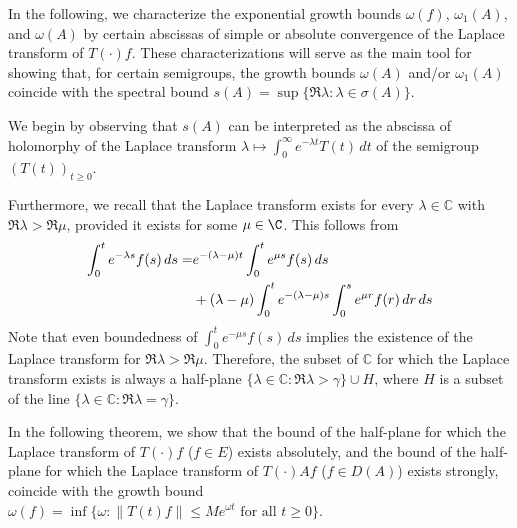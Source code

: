 \noindent
In the following, we characterize the exponential growth bounds $\omega(f)$, $\omega_{1}(A)$, and $\omega(A)$ by certain abscissas of simple or absolute convergence of the Laplace transform of $T(\cdot)f$. 
These characterizations will serve as the main tool for showing that, for certain semigroups, the growth bounds $\omega(A)$ and/or $\omega_{1}(A)$ coincide with the spectral bound $s(A) = \sup\{\Re \lambda : \lambda \in \sigma(A)\}$.

\bigskip
\noindent
We begin by observing that $s(A)$ can be interpreted as the abscissa of holomorphy of the Laplace transform $\lambda \mapsto \int_{0}^{\infty} e^{-\lambda t} T(t) \, dt$ of the semigroup $(T(t))_{t \geq 0}$.

\noindent
Furthermore, we recall that the Laplace transform exists for every $\lambda \in \mathbb{C}$ with $\Re \lambda > \Re \mu$, provided it exists for some $\mu\in\C$.
This follows from 
\begin{align}\label{eq:a4-1.1}
\int_0^t e^{-\lambda s} f(s)\, ds = &e^{-(\lambda-\mu)t} \int_{0}^{t} e^{\mu s} f(s) \, ds \\ &+ (\lambda - \mu) \int_{0}^{t} e^{-(\lambda-\mu)s} \int_{0}^{s} e^{\mu r} f(r) \, dr \, ds \notag
\end{align}
Note that even boundedness of $\int_{0}^{t} e^{-\mu s}f(s) \, ds$ implies the existence of the Laplace transform for $\Re \lambda > \Re \mu$. 
Therefore, the subset of $\mathbb{C}$ for which the Laplace transform exists is always a half-plane $\{\lambda \in \mathbb{C} : \Re \lambda > \gamma\} \cup H$, where $H$ is a subset of the line $\{\lambda \in \mathbb{C} : \Re \lambda = \gamma\}$.

\bigskip
\noindent
In the following theorem, we show that the bound of the half-plane for which the Laplace transform of $T(\cdot)f$ ($f \in E$) exists absolutely, and the bound of the half-plane for which the Laplace transform of $T(\cdot)Af$ ($f \in D(A)$) exists strongly, coincide with the growth bound $\omega(f) = \inf\{\omega : \|T(t)f\| \leq Me^{\omega t} \text{ for all } t \geq 0\}$.

